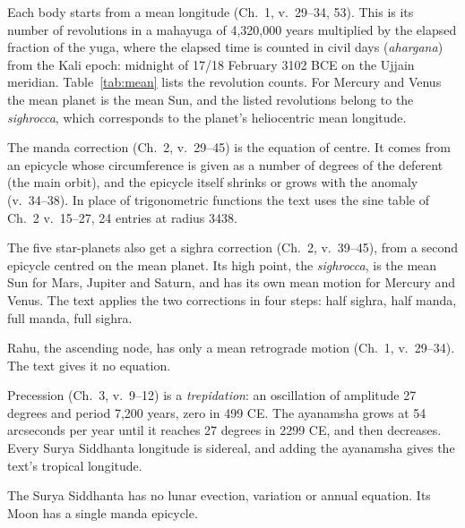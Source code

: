 \documentclass[11pt,a4paper]{article}
\begin{document}
Each body starts from a mean longitude (Ch.~1, v.~29--34, 53). This is its number of revolutions in a mahayuga of 4,320,000 years multiplied by the elapsed fraction of the yuga, where the elapsed time is counted in civil days (\textit{ahargana}) from the Kali epoch: midnight of 17/18 February 3102 BCE on the Ujjain meridian. Table~\ref{tab:mean} lists the revolution counts. For Mercury and Venus the mean planet is the mean Sun, and the listed revolutions belong to the \textit{sighrocca}, which corresponds to the planet's heliocentric mean longitude.

The manda correction (Ch.~2, v.~29--45) is the equation of centre. It comes from an epicycle whose circumference is given as a number of degrees of the deferent (the main orbit), and the epicycle itself shrinks or grows with the anomaly (v.~34--38). In place of trigonometric functions the text uses the sine table of Ch.~2 v.~15--27, 24 entries at radius 3438.

The five star-planets also get a sighra correction (Ch.~2, v.~39--45), from a second epicycle centred on the mean planet. Its high point, the \textit{sighrocca}, is the mean Sun for Mars, Jupiter and Saturn, and has its own mean motion for Mercury and Venus. The text applies the two corrections in four steps: half sighra, half manda, full manda, full sighra.

Rahu, the ascending node, has only a mean retrograde motion (Ch.~1, v.~29--34). The text gives it no equation.

Precession (Ch.~3, v.~9--12) is a \emph{trepidation}: an oscillation of amplitude 27 degrees and period 7,200 years, zero in 499 CE. The ayanamsha grows at 54 arcseconds per year until it reaches 27 degrees in 2299 CE, and then decreases. Every Surya Siddhanta longitude is sidereal, and adding the ayanamsha gives the text's tropical longitude.

The Surya Siddhanta has no lunar evection, variation or annual equation. Its Moon has a single manda epicycle.
\end{document}
